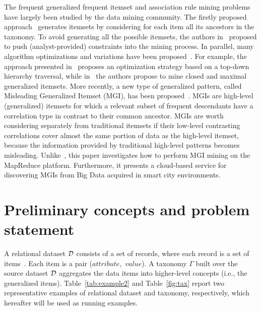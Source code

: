 \documentclass[10pt, conference, compsocconf]{IEEEtran}
\begin{document}
The frequent generalized frequent itemset and association rule mining problems~\cite{Srikant1995} have largely been studied by the data mining community.
The firstly proposed approach~\cite{Srikant1995} generates itemsets by considering for each item all its ancestors in the taxonomy. 
To avoid generating all the possible itemsets, the authors in~\cite{Sriphaew2002,BaralisCCG12} proposed to push (analyst-provided) constraints into the mining process.
In parallel, many algorithm optimizations and variations have been proposed~\cite{Han1999,KunkleZC08,ChangeTKDE}. 
For example, the approach presented in~\cite{Han1999} proposes an optimization strategy based on a top-down hierarchy traversal, while 
in~\cite{KunkleZC08} the authors propose to mine closed and maximal generalized itemsets. 
More recently, a new type of generalized pattern, called Misleading Generalized Itemset (MGI), has been proposed~\cite{MGI}. 
MGIs are high-level (generalized) itemsets for which a relevant subset of frequent descendants have a correlation type in contrast to their common ancestor. 
MGIs are worth considering separately from traditional itemsets if their low-level contrasting correlations cover almost the same portion of data as the high-level itemset, 
because the information provided by traditional high-level patterns becomes misleading. 
Unlike~\cite{MGI}, this paper investigates how to perform MGI mining on the MapReduce platform. 
Furthermore, it presents a cloud-based service for discovering MGIs from Big Data acquired in smart city environments.


\section{Preliminary concepts and problem statement}
\label{probstat}

A relational dataset $\cal{D}$ consists of a set of records, where each record is a set of items~\cite{KumarBook}. Each item is a pair ($attribute$,~$value$).
A taxonomy $\Gamma$ built over the source dataset $\cal{D}$  aggregates the data items into higher-level concepts (i.e., the generalized items). 
Table~\ref{tab:example2} and Table~\ref{fig:tax} report two representative examples of relational dataset and taxonomy, respectively, which hereafter will be used as running examples. 
\end{document}
